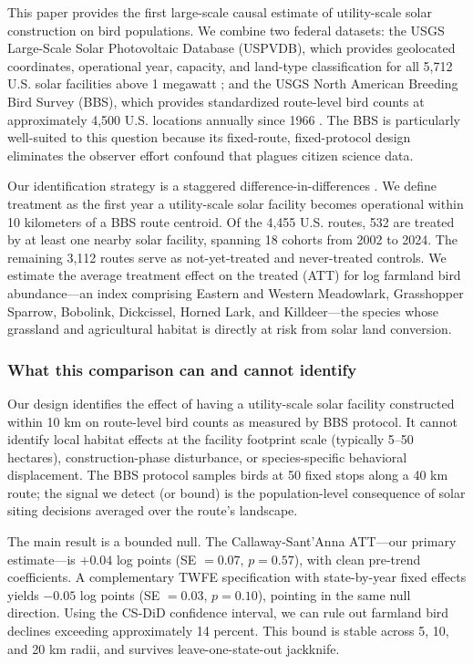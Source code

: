 \documentclass[12pt]{article}
\begin{document}
This paper provides the first large-scale causal estimate of utility-scale solar construction on bird populations. We combine two federal datasets: the USGS Large-Scale Solar Photovoltaic Database (USPVDB), which provides geolocated coordinates, operational year, capacity, and land-type classification for all 5,712 U.S. solar facilities above 1 megawatt \citep{usgs_uspvdb2025}; and the USGS North American Breeding Bird Survey (BBS), which provides standardized route-level bird counts at approximately 4,500 U.S. locations annually since 1966 \citep{sauer2017, usgs_bbs2025}. The BBS is particularly well-suited to this question because its fixed-route, fixed-protocol design eliminates the observer effort confound that plagues citizen science data.

Our identification strategy is a staggered difference-in-differences \citep{callaway2021}. We define treatment as the first year a utility-scale solar facility becomes operational within 10 kilometers of a BBS route centroid. Of the 4,455 U.S. routes, 532 are treated by at least one nearby solar facility, spanning 18 cohorts from 2002 to 2024. The remaining 3,112 routes serve as not-yet-treated and never-treated controls. We estimate the average treatment effect on the treated (ATT) for log farmland bird abundance---an index comprising Eastern and Western Meadowlark, Grasshopper Sparrow, Bobolink, Dickcissel, Horned Lark, and Killdeer---the species whose grassland and agricultural habitat is directly at risk from solar land conversion.

\subsubsection*{What this comparison can and cannot identify} Our design identifies the effect of having a utility-scale solar facility constructed within 10 km on route-level bird counts as measured by BBS protocol. It cannot identify local habitat effects at the facility footprint scale (typically 5--50 hectares), construction-phase disturbance, or species-specific behavioral displacement. The BBS protocol samples birds at 50 fixed stops along a 40 km route; the signal we detect (or bound) is the population-level consequence of solar siting decisions averaged over the route's landscape.

The main result is a bounded null. The Callaway-Sant'Anna ATT---our primary estimate---is $+0.04$ log points (SE $= 0.07$, $p = 0.57$), with clean pre-trend coefficients. A complementary TWFE specification with state-by-year fixed effects yields $-0.05$ log points (SE $= 0.03$, $p = 0.10$), pointing in the same null direction. Using the CS-DiD confidence interval, we can rule out farmland bird declines exceeding approximately 14 percent. This bound is stable across 5, 10, and 20 km radii, and survives leave-one-state-out jackknife.
\end{document}
